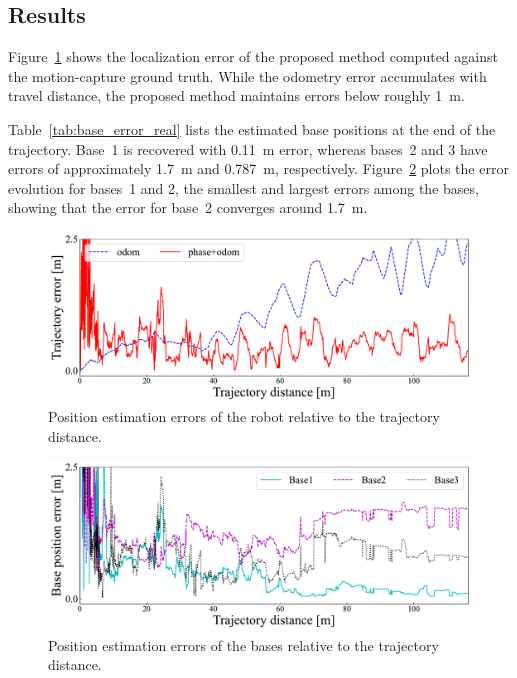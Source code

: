 \documentclass[conference]{IEEEtran}
\begin{document}
\subsection{Results}
Figure~\ref{fig:error_real} shows the localization error of the proposed method computed against the motion-capture ground truth.
While the odometry error accumulates with travel distance, the proposed method maintains errors below roughly 1~m.

Table~\ref{tab:base_error_real} lists the estimated base positions at the end of the trajectory.
Base~1 is recovered with 0.11~m error, whereas bases~2 and 3 have errors of approximately 1.7~m and 0.787~m, respectively.
Figure~\ref{fig:error_base} plots the error evolution for bases~1 and 2, the smallest and largest errors among the bases, showing that the error for base~2 converges around 1.7~m.

\begin{figure}
    \centering
    \includegraphics[width=0.95\linewidth]{project/figures/icara_1018_resutl_2_online_rover_position_error_comparison.pdf}
    \caption{Position estimation errors of the robot relative to the trajectory distance.}
    \label{fig:error_real}
\end{figure}

\begin{figure}
    \centering
    \includegraphics[width=0.95\linewidth]{project/figures/icara_1018_resutl_2_online_base_position_error_comparison.pdf}
    \caption{Position estimation errors of the bases relative to the trajectory distance.}
    \label{fig:error_base}
\end{figure}
\end{document}
